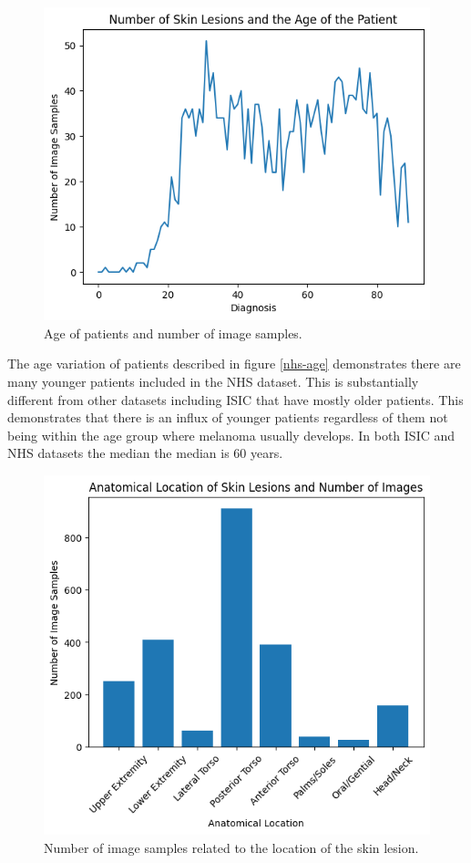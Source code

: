  \begin{figure}
    \centering
    \includegraphics[scale=0.75]{images/nhs/nhs-age.png}
    \caption{Age of patients and number of image samples.} 
\end{figure}\label{nhs-age}

The age variation of patients described in figure \ref{nhs-age} demonstrates there are many younger patients included in the NHS dataset. This is substantially different from other datasets including ISIC that have mostly older patients. This demonstrates that there is an influx of younger patients regardless of them not being within the age group where melanoma usually develops. In both ISIC and NHS datasets the median the median is 60 years.

\begin{figure}
    \centering
    \includegraphics[scale=0.75]{images/nhs/nhs-location.png}
    \caption{Number of image samples related to the location of the skin lesion.} 
\end{figure}\label{nhs-location}

